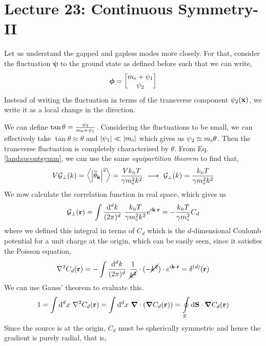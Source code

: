 \section*{Lecture 23: Continuous Symmetry-II}
Let us understand the gapped and gapless modes more closely. For that, consider the fluctuation $\boldsymbol{\psi}$ to the ground state as defined before such that we can write, 
$$\bphi  = \mqty[m\tund{0}+\psi_1\\ \psi_2] $$ Instead of writing the fluctuation in terms of the transverse component $\psi_2(\vb{x})$, we write it as a local change in the direction.
\begin{figure}[H]
    \centering
    
\end{figure}
\noindent
We can define $\tan \theta = \frac{\psi_2}{m_{\text{\tiny 0}}+\psi_1}$. Considering the fluctuations to be small, we can effectively take $\tan \theta \approx \theta$ and $\abs{\psi_1}\ll \abs{m_{\text{\tiny 0}}}$ which gives us $\psi_2 \simeq m_{\text{\tiny 0}}\theta$. Then the transverse fluctuation is completely characterised by $\theta$. From Eq. \eqref{landaucontsymm}, we can use the same \textit{equipartition theorem} to find that, $$V\mathcal G_{\perp}(k) = \expval{\abs{\widetilde{\theta}_{\vb{k}}}^2} = \frac{Vk_{\text{\tiny B}} T}{\gamma m_{\text{\tiny 0}}^2 k^2} \ \longrightarrow \ \mathcal G_{\perp}(k) = \frac{k_{\text{\tiny B}} T}{\gamma m_{\text{\tiny 0}}^2 k^2}$$
We now calculate the correlation function in real space, which gives us
\begin{equation}
    \mathcal G_{\perp}(\vb{r}) = \int \frac{\dd^d k}{(2\pi)^d}\ \frac{k_{\text{\tiny B}} T}{\gamma m_{\text{\tiny 0}}^2 k^2} e^{i\vb{k}\cdot \vb{r}} = - \frac{k_{\text{\tiny B}} T}{\gamma m_{\text{\tiny 0}}^2} C_d
\end{equation}
where we defined this integral in terms of $C_d$ which is the $d$-dimensional Coulomb potential for a unit charge at the origin, which can be easily seen, since it satisfies the Poisson equation,
\begin{equation}
    \nabla^2 C_d(\vb{r}) = - \int  \frac{\dd^d k}{(2\pi)^d}\ \frac{1}{ \cancel{k^2}}\cdot (-\cancel{k^2})\cdot  e^{i\vb{k}\cdot \vb{r}} =  \delta^{(d)}(\vb{r})
\end{equation}
We can use Gauss' theorem to evaluate this.
\begin{equation}
  1 =   \int \dd^d x \ \nabla^2 C_d(\vb{r}) =  \int \dd^d x \ \grad \cdot (\grad C_d(\vb{r})) = \oint\limits_{S} \dd{\vb{S}} \cdot \grad C_d(\vb{r})
\end{equation}
Since the source is at the origin, $C_d$ must be spherically symmetric and hence the gradient is purely radial, that is,
